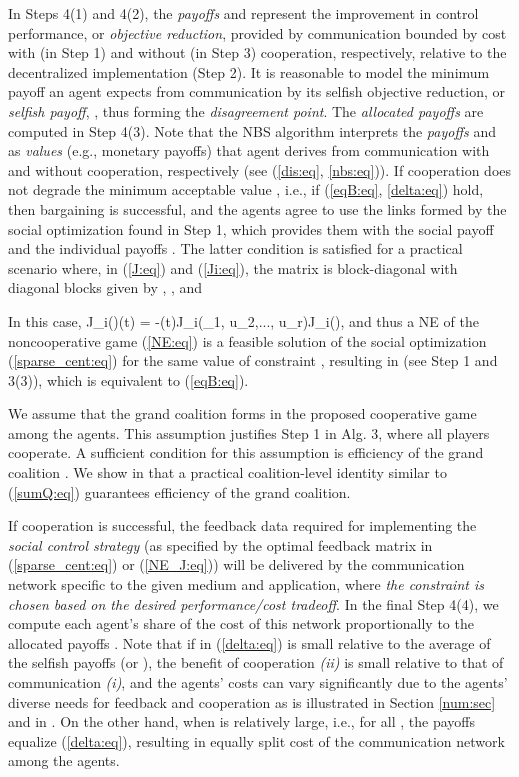 \documentclass[12pt, draftclsnofoot,onecolumn]{IEEEtran}
\begin{document}
In Steps 4(1) and 4(2), the {\it payoffs}  and  represent the improvement in control performance, or {\it objective reduction}, provided by communication bounded by cost  with (in Step 1) and without (in Step 3) cooperation, respectively, relative to the decentralized implementation (Step 2). It is reasonable to model the minimum payoff an agent  expects from communication by its selfish objective reduction, or {\it selfish payoff}, , thus forming the {\it disagreement point}. The {\it allocated payoffs}  are computed in Step 4(3). Note that the NBS algorithm interprets the {\it payoffs}  and  as {\it values} (e.g., monetary payoffs) that agent  derives from communication with and without cooperation, respectively (see (\ref{dis:eq}, \ref{nbs:eq})). If cooperation does not degrade the minimum acceptable value , i.e., if (\ref{eqB:eq}, \ref{delta:eq}) hold, then bargaining is successful, and the agents agree to use the links formed by the social optimization found in Step 1, which provides them with the social payoff  and the individual payoffs . The latter condition is satisfied for a practical scenario where, in (\ref{J:eq}) and (\ref{Ji:eq}), the matrix  is block-diagonal with diagonal blocks given by , , and

\noindent
In this case, J_i()(t) = -(t)J_i(_1, {\boldsymbol u}_2,..., {\boldsymbol u}_r)J_i(), and thus a NE of the noncooperative game (\ref{NE:eq}) is a feasible solution of the social optimization (\ref{sparse_cent:eq}) for the same value of constraint , resulting in  (see Step 1 and 3(3)), which is equivalent to (\ref{eqB:eq}). 

We assume that the grand coalition forms in the proposed cooperative game among the agents. This assumption justifies Step 1 in Alg. 3, where all players cooperate. A sufficient condition for this assumption is efficiency of the grand coalition \cite{Hafalir2007242}. We show in \cite{Lian:aa} that a practical coalition-level identity similar to (\ref{sumQ:eq}) guarantees efficiency of the grand coalition.

If cooperation is successful, the feedback data required for implementing the {\it social control strategy} (as specified by the optimal feedback matrix in (\ref{sparse_cent:eq}) or (\ref{NE_J:eq})) will be delivered by the communication network specific to the given medium and application, where {\it the constraint  is chosen based on the desired performance/cost tradeoff}. In the final Step 4(4), we compute each agent's share of the cost of this network proportionally to the allocated payoffs . Note that if  in (\ref{delta:eq}) is small relative to the average of the selfish payoffs  (or ), the benefit of cooperation {\it (ii)} is small relative to that of communication {\it (i)}, and the agents' costs  can vary significantly due to the agents' diverse needs for feedback and cooperation as is illustrated in Section \ref{num:sec} and in \cite{lianensuring}. On the other hand, when  is relatively large, i.e.,  for all , the payoffs equalize (\ref{delta:eq}), resulting in equally split cost of the communication network among the agents.
\end{document}
